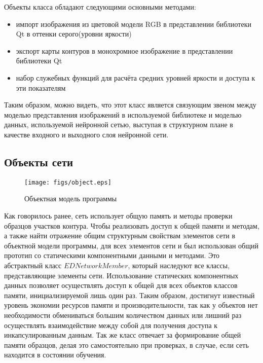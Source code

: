 \documentclass[a4paper,12pt]{report}
\begin{document}
Объекты класса обладают следующими основными методами:
\begin{itemize}
\item{импорт изображения из цветовой модели RGB в представлении библиотеки Qt в оттенки серого(уровни яркости)}
\item{экспорт карты контуров в монохромное изображение в представлении библиотеки Qt}
\item{набор служебных функций для расчёта средних уровней яркости и доступа к эти показателям}
\end{itemize}

Таким образом, можно видеть, что этот класс является связующим звеном между моделью представления изображений в используемой библиотеке и моделью данных, используемой нейронной сетью, выступая в структурном плане в качестве входного и выходного слоя нейронной сети.

\subsection{Объекты сети}
\begin{center}
\begin{figure}[!t]
\begin{center}
\texttt{[image: figs/object.eps]}
\end{center}\caption{Объектная модель программы}
\label{objectmodel}
\end{figure}
\end{center}
Как говорилось ранее, сеть использует общую память и методы проверки образцов участков контура. Чтобы реализовать доступ к общей памяти и методам, а также найти отражение общим структурным свойствам элементов сети в объектной модели программы, для всех элементов сети и был использован общий прототип со статическими компонентными данными и методами. Это абстрактный класс $EDNetworkMember$, который наследуют все классы, представляющие элементы сети. Использование статических компонентных данных позволяет осуществлять доступ к общей для всех объектов классов памяти, инициализируемой лишь один раз. Таким образом, достигнут известный уровень экономии ресурсов памяти и производительности, так как у объектов нет необходимости обмениваться большим количеством данных или лишний раз осуществлять взаимодействие между собой для получения доступа к инкапсулированным данным. Так же класс отвечает за формирование общей памяти образцов, делая это самостоятельно при проверках, в случае, если сеть находится в состоянии обучения. 
\end{document}
